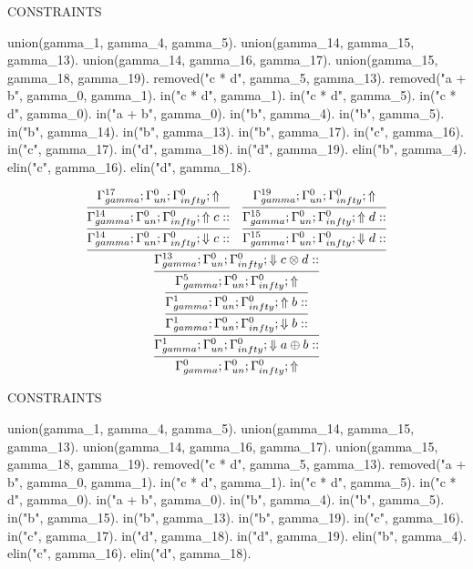 \documentclass[a4paper, 11pt]{article}
\begin{document}
CONSTRAINTS 

union(gamma\_1, gamma\_4, gamma\_5).
union(gamma\_14, gamma\_15, gamma\_13).
union(gamma\_14, gamma\_16, gamma\_17).
union(gamma\_15, gamma\_18, gamma\_19).
removed("c * d", gamma\_5, gamma\_13).
removed("a + b", gamma\_0, gamma\_1).
in("c * d", gamma\_1).
in("c * d", gamma\_5).
in("c * d", gamma\_0).
in("a + b", gamma\_0).
in("b", gamma\_4).
in("b", gamma\_5).
in("b", gamma\_14).
in("b", gamma\_13).
in("b", gamma\_17).
in("c", gamma\_16).
in("c", gamma\_17).
in("d", gamma\_18).
in("d", gamma\_19).
elin("b", gamma\_4).
elin("c", gamma\_16).
elin("d", gamma\_18).

\[
\infer{\Gamma_{ gamma}^{0} ; \Gamma_{un}^{0} ; \Gamma_{ infty}^{0} ;  \Uparrow }
{\infer{\Gamma_{ gamma}^{1} ; \Gamma_{un}^{0} ; \Gamma_{ infty}^{0} ;  \Downarrow a \oplus b :: }
{\infer{\Gamma_{ gamma}^{1} ; \Gamma_{un}^{0} ; \Gamma_{ infty}^{0} ;  \Downarrow b :: }
{\infer{\Gamma_{ gamma}^{1} ; \Gamma_{un}^{0} ; \Gamma_{ infty}^{0} ;  \Uparrow b :: }
{\infer{\Gamma_{ gamma}^{5} ; \Gamma_{un}^{0} ; \Gamma_{ infty}^{0} ;  \Uparrow }
{\infer{\Gamma_{ gamma}^{13} ; \Gamma_{un}^{0} ; \Gamma_{ infty}^{0} ;  \Downarrow c \otimes d :: }
{\infer{\Gamma_{ gamma}^{14} ; \Gamma_{un}^{0} ; \Gamma_{ infty}^{0} ;  \Downarrow c :: }
{\infer{\Gamma_{ gamma}^{14} ; \Gamma_{un}^{0} ; \Gamma_{ infty}^{0} ;  \Uparrow c :: }
{\Gamma_{ gamma}^{17} ; \Gamma_{un}^{0} ; \Gamma_{ infty}^{0} ;  \Uparrow }}
&
\infer{\Gamma_{ gamma}^{15} ; \Gamma_{un}^{0} ; \Gamma_{ infty}^{0} ;  \Downarrow d :: }
{\infer{\Gamma_{ gamma}^{15} ; \Gamma_{un}^{0} ; \Gamma_{ infty}^{0} ;  \Uparrow d :: }
{\Gamma_{ gamma}^{19} ; \Gamma_{un}^{0} ; \Gamma_{ infty}^{0} ;  \Uparrow }}}}}}}}
\]
 
CONSTRAINTS 

union(gamma\_1, gamma\_4, gamma\_5).
union(gamma\_14, gamma\_15, gamma\_13).
union(gamma\_14, gamma\_16, gamma\_17).
union(gamma\_15, gamma\_18, gamma\_19).
removed("c * d", gamma\_5, gamma\_13).
removed("a + b", gamma\_0, gamma\_1).
in("c * d", gamma\_1).
in("c * d", gamma\_5).
in("c * d", gamma\_0).
in("a + b", gamma\_0).
in("b", gamma\_4).
in("b", gamma\_5).
in("b", gamma\_15).
in("b", gamma\_13).
in("b", gamma\_19).
in("c", gamma\_16).
in("c", gamma\_17).
in("d", gamma\_18).
in("d", gamma\_19).
elin("b", gamma\_4).
elin("c", gamma\_16).
elin("d", gamma\_18).
\end{document}
